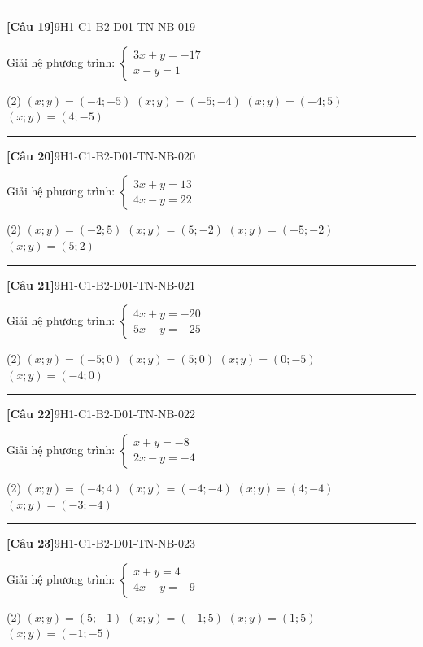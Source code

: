 \documentclass[12pt,a4paper]{article}
\newif\ifloigiai
\newenvironment{cauhoi}[2]{%
  \par\medskip\noindent\rule{\textwidth}{0.4pt}\par\nopagebreak
  \noindent\textbf{[#1]}\hfill{\scriptsize\ttfamily #2}\par\nopagebreak\smallskip}{\par}
\newcommand{\dapan}[1]{\ifloigiai\par\smallskip\noindent\textit{Đáp án:} \textbf{#1}\par\fi}
\begin{document}
\begin{cauhoi}{Câu 19}{9H1-C1-B2-D01-TN-NB-019}
Giải hệ phương trình: $\begin{cases}3x + y=-17\\ x - y=1\end{cases}$
\begin{tasks}(2)
\task $(x;y)=(-4;-5)$
\task $(x;y)=(-5;-4)$
\task $(x;y)=(-4;5)$
\task $(x;y)=(4;-5)$
\end{tasks}
\dapan{A}
\end{cauhoi}
\begin{cauhoi}{Câu 20}{9H1-C1-B2-D01-TN-NB-020}
Giải hệ phương trình: $\begin{cases}3x + y=13\\ 4x - y=22\end{cases}$
\begin{tasks}(2)
\task $(x;y)=(-2;5)$
\task $(x;y)=(5;-2)$
\task $(x;y)=(-5;-2)$
\task $(x;y)=(5;2)$
\end{tasks}
\dapan{B}
\end{cauhoi}
\begin{cauhoi}{Câu 21}{9H1-C1-B2-D01-TN-NB-021}
Giải hệ phương trình: $\begin{cases}4x + y=-20\\ 5x - y=-25\end{cases}$
\begin{tasks}(2)
\task $(x;y)=(-5;0)$
\task $(x;y)=(5;0)$
\task $(x;y)=(0;-5)$
\task $(x;y)=(-4;0)$
\end{tasks}
\dapan{A}
\end{cauhoi}
\begin{cauhoi}{Câu 22}{9H1-C1-B2-D01-TN-NB-022}
Giải hệ phương trình: $\begin{cases}x + y=-8\\ 2x - y=-4\end{cases}$
\begin{tasks}(2)
\task $(x;y)=(-4;4)$
\task $(x;y)=(-4;-4)$
\task $(x;y)=(4;-4)$
\task $(x;y)=(-3;-4)$
\end{tasks}
\dapan{B}
\end{cauhoi}
\begin{cauhoi}{Câu 23}{9H1-C1-B2-D01-TN-NB-023}
Giải hệ phương trình: $\begin{cases}x + y=4\\ 4x - y=-9\end{cases}$
\begin{tasks}(2)
\task $(x;y)=(5;-1)$
\task $(x;y)=(-1;5)$
\task $(x;y)=(1;5)$
\task $(x;y)=(-1;-5)$
\end{tasks}
\dapan{B}
\end{cauhoi}
\end{document}
